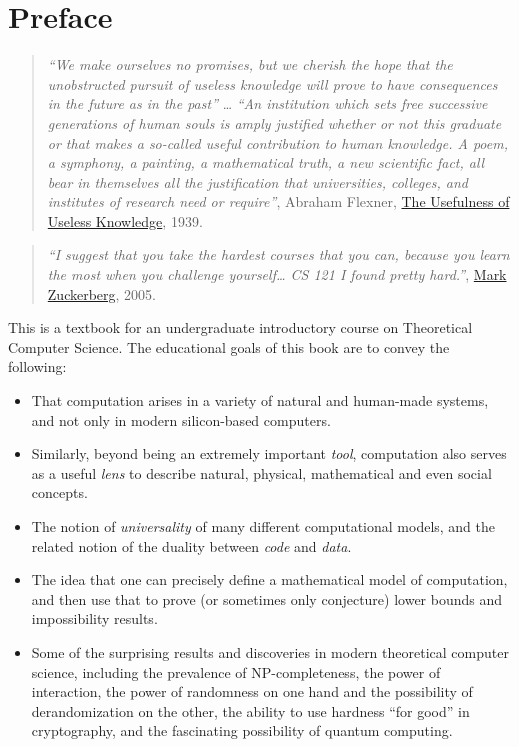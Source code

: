 \chapter{Preface}\label{prefacechap}

\begin{quote}
\emph{``We make ourselves no promises, but we cherish the hope that the
unobstructed pursuit of useless knowledge will prove to have
consequences in the future as in the past''} \ldots{} \emph{``An
institution which sets free successive generations of human souls is
amply justified whether or not this graduate or that makes a so-called
useful contribution to human knowledge. A poem, a symphony, a painting,
a mathematical truth, a new scientific fact, all bear in themselves all
the justification that universities, colleges, and institutes of
research need or require''}, Abraham Flexner,
\href{https://library.ias.edu/files/UsefulnessHarpers.pdf}{The
Usefulness of Useless Knowledge}, 1939.
\end{quote}

\begin{quote}
\emph{``I suggest that you take the hardest courses that you can,
because you learn the most when you challenge yourself\ldots{} CS 121 I
found pretty hard.''}, \href{https://youtu.be/xFFs9UgOAlE?t=3646}{Mark
Zuckerberg}, 2005.
\end{quote}

This is a textbook for an undergraduate introductory course on
Theoretical Computer Science. The educational goals of this book are to
convey the following:

\begin{itemize}
\item
  That computation arises in a variety of natural and human-made
  systems, and not only in modern silicon-based computers.
\item
  Similarly, beyond being an extremely important \emph{tool},
  computation also serves as a useful \emph{lens} to describe natural,
  physical, mathematical and even social concepts.
\item
  The notion of \emph{universality} of many different computational
  models, and the related notion of the duality between \emph{code} and
  \emph{data}.
\item
  The idea that one can precisely define a mathematical model of
  computation, and then use that to prove (or sometimes only conjecture)
  lower bounds and impossibility results.
\item
  Some of the surprising results and discoveries in modern theoretical
  computer science, including the prevalence of NP-completeness, the
  power of interaction, the power of randomness on one hand and the
  possibility of derandomization on the other, the ability to use
  hardness ``for good'' in cryptography, and the fascinating possibility
  of quantum computing.
\end{itemize}

